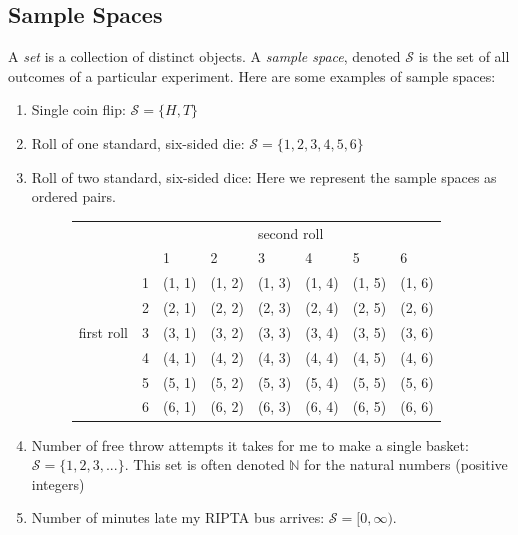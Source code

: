 \documentclass[12pt]{article}
\theoremstyle{definition}
\theoremstyle{remark}
\def\N{{\mathbb N}}
\def\cals{{\mathcal S}}
\begin{document}
\subsection{Sample Spaces}
A \emph{set} is a collection of distinct objects. A \emph{sample space}, denoted $\cals$ is the set of all outcomes of a particular experiment. Here are some examples of sample spaces:
\begin{enumerate}
\item Single coin flip: $\cals = \{H, T\}$
\item Roll of one standard, six-sided die: $\cals = \{1, 2, 3, 4, 5, 6\}$
\item Roll of two standard, six-sided dice: Here we represent the sample spaces as ordered pairs.

\begin{figure}[H]
\centering
\label{twodice}
\begin{tabular}{llllllll}
           &                        &        &        & \multicolumn{2}{l}{second roll} &        &                             \\
           &                        & 1      & 2      & 3              & 4              & 5      & 6                           \\ \cline{3-8} 
           & \multicolumn{1}{l|}{1} & (1, 1) & (1, 2) & (1, 3)         & (1, 4)         & (1, 5) & \multicolumn{1}{l|}{(1, 6)} \\
           & \multicolumn{1}{l|}{2} & (2, 1) & (2, 2) & (2, 3)         & (2, 4)         & (2, 5) & \multicolumn{1}{l|}{(2, 6)} \\
first roll & \multicolumn{1}{l|}{3} & (3, 1) & (3, 2) & (3, 3)         & (3, 4)         & (3, 5) & \multicolumn{1}{l|}{(3, 6)} \\
           & \multicolumn{1}{l|}{4} & (4, 1) & (4, 2) & (4, 3)         & (4, 4)         & (4, 5) & \multicolumn{1}{l|}{(4, 6)} \\
           & \multicolumn{1}{l|}{5} & (5, 1) & (5, 2) & (5, 3)         & (5, 4)         & (5, 5) & \multicolumn{1}{l|}{(5, 6)} \\
           & \multicolumn{1}{l|}{6} & (6, 1) & (6, 2) & (6, 3)         & (6, 4)         & (6, 5) & \multicolumn{1}{l|}{(6, 6)} \\ \cline{3-8} 
\end{tabular}
\end{figure}

\item Number of free throw attempts it takes for me to make a single basket: $\cals = \{1, 2, 3, ...\}$. This set is often denoted $\N$ for the natural numbers (positive integers)
\item Number of minutes late my RIPTA bus arrives: $\cals = [0, \infty)$. 
\end{enumerate}
\end{document}
